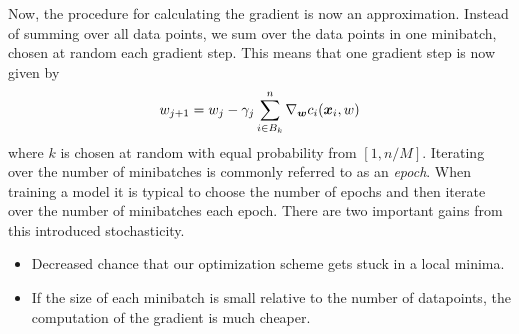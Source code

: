 Now, the procedure for calculating the gradient is now an approximation. Instead of
summing over all data points, we sum over the data points in one minibatch, chosen
at random each gradient step. This means that one gradient step is now given by
\begin{equation}\label{eq:sgd}
	w_{j+1} = w_j - \gamma_j \sum_{i\in B_k}^{n}\nabla_{{\boldsymbol{w}}}c_i({\boldsymbol{x}}_i, w)
\end{equation}
where $k$ is chosen at random with equal probability from $[1, n/M]$.
Iterating over the number of minibatches is commonly referred to as an \textit{epoch}.
When training a model it is typical to choose the number of epochs and then iterate
over the number of minibatches each epoch. There are two important gains from this 
introduced stochasticity.
\begin{itemize}
	\item Decreased chance that our optimization scheme gets stuck in a local minima.
	\item If the size of each minibatch is small relative to the number of datapoints,
	the computation of the gradient is much cheaper.
\end{itemize}

